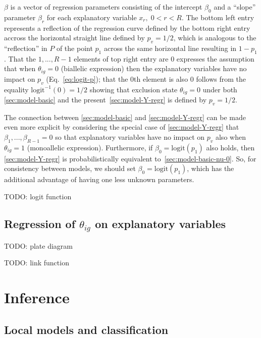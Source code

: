 \documentclass[letterpaper]{article}
\begin{document}
\(\beta\) is a vector of regression parameters
consisting of the intercept \(\beta_0\) and a ``slope'' parameter
\(\beta_{r}\) for each explanatory variable \(x_r, \; 0<r<R\).
The bottom left entry represents a reflection of the regression curve defined
by the bottom right entry accross the horizontal straight line defined by \(p_v=1/2\),
which is analogous to the ``reflection'' in \(P\) of the point \(p_1\) across the same
horizontal line resulting in \(1-p_1\).
That the \(1,...,R-1\) elements of top right entry are \(0\) expresses the
assumption that when \(\theta_{ig}=0\) (biallelic expression) then the
explanatory variables have no impact on \(p_v\) (Eq.~\ref{eq:logit-p}); that
the \(0\)th element is also \(0\) follows from the equality
\(\mathrm{logit}^{-1}(0)=1/2\) showing that exclusion state \(\theta_{ig}=0\)
under both \ref{sec:model-basic} and the present~\ref{sec:model-Y-regr}
is defined by \(p_v=1/2\).

The connection between \ref{sec:model-basic} and \ref{sec:model-Y-regr} can be
made even more explicit by considering the special case of
\ref{sec:model-Y-regr} that \(\beta_1,...,\beta_{R-1}=0\) so that explanatory
variables have no impact on \(p_v\) also when \(\theta_{ig}=1\) (monoallelic
expression).  Furthermore, if \(\beta_0=\mathrm{logit}(p_1)\) also holds, then
\ref{sec:model-Y-regr} is probabilistically equivalent
to~\ref{sec:model-basic-nu-0}.  So, for consistency between models, we should
set \(\beta_0=\mathrm{logit}(p_1)\), which has the additional advantage of
having one less unknown parameters.

TODO: logit function

\subsection{Regression of \(\theta_{ig}\) on explanatory variables }
\label{sec:model-theta-regr}

TODO: plate diagram

TODO: link function

\renewcommand{\thesubsection}{\arabic{section}.\arabic{subsection}}
\section{Inference}
\label{sec:likelihood}

\subsection{Local models and classification}
\end{document}
